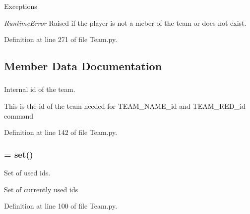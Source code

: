 \begin{DoxyExceptions}{Exceptions}
\item[{\em RuntimeError}]Raised if the player is not a meber of the team or does not exist. \end{DoxyExceptions}


Definition at line 271 of file Team.py.



\subsection{Member Data Documentation}
\hypertarget{class_team_1_1_team_a7ce63ee4a4004c0248fd10694054f459}{
\subsubsection[{\_\-\_\-id}]{}}
\label{class_team_1_1_team_a7ce63ee4a4004c0248fd10694054f459}


Internal id of the team. 

This is the id of the team needed for TEAM\_\-NAME\_\-id and TEAM\_\-RED\_\-id command 

Definition at line 142 of file Team.py.

\hypertarget{class_team_1_1_team_a262d61c33dc00a565e627421b95280e4}{
\subsubsection[{\_\-\_\-ids}]{ = set()}}
\label{class_team_1_1_team_a262d61c33dc00a565e627421b95280e4}


Set of used ids. 

Set of currently used ids 

Definition at line 100 of file Team.py.

\hypertarget{class_team_1_1_team_a5298a0b6a24b1c1245690a39b1b83d19}{
\subsubsection[{\_\-\_\-members}]{}}
\label{class_team_1_1_team_a5298a0b6a24b1c1245690a39b1b83d19}


